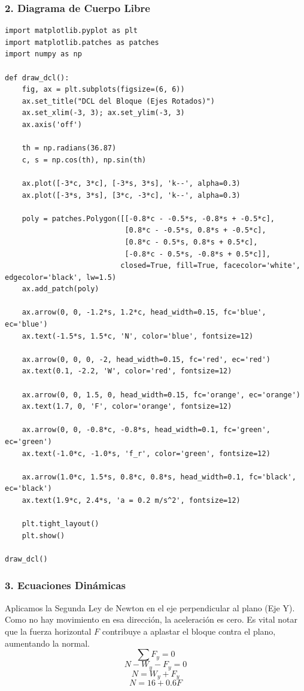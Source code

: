 \documentclass[12pt, a4paper]{article}
\begin{document}
\subsubsection*{2. Diagrama de Cuerpo Libre}

\begin{lstlisting}
import matplotlib.pyplot as plt
import matplotlib.patches as patches
import numpy as np

def draw_dcl():
    fig, ax = plt.subplots(figsize=(6, 6))
    ax.set_title("DCL del Bloque (Ejes Rotados)")
    ax.set_xlim(-3, 3); ax.set_ylim(-3, 3)
    ax.axis('off')
    
    th = np.radians(36.87)
    c, s = np.cos(th), np.sin(th)
    
    ax.plot([-3*c, 3*c], [-3*s, 3*s], 'k--', alpha=0.3)
    ax.plot([-3*s, 3*s], [3*c, -3*c], 'k--', alpha=0.3)
    
    poly = patches.Polygon([[-0.8*c - -0.5*s, -0.8*s + -0.5*c], 
                            [0.8*c - -0.5*s, 0.8*s + -0.5*c], 
                            [0.8*c - 0.5*s, 0.8*s + 0.5*c], 
                            [-0.8*c - 0.5*s, -0.8*s + 0.5*c]], 
                           closed=True, fill=True, facecolor='white', edgecolor='black', lw=1.5)
    ax.add_patch(poly)
    
    ax.arrow(0, 0, -1.2*s, 1.2*c, head_width=0.15, fc='blue', ec='blue')
    ax.text(-1.5*s, 1.5*c, 'N', color='blue', fontsize=12)
    
    ax.arrow(0, 0, 0, -2, head_width=0.15, fc='red', ec='red')
    ax.text(0.1, -2.2, 'W', color='red', fontsize=12)
    
    ax.arrow(0, 0, 1.5, 0, head_width=0.15, fc='orange', ec='orange')
    ax.text(1.7, 0, 'F', color='orange', fontsize=12)
    
    ax.arrow(0, 0, -0.8*c, -0.8*s, head_width=0.1, fc='green', ec='green')
    ax.text(-1.0*c, -1.0*s, 'f_r', color='green', fontsize=12)
    
    ax.arrow(1.0*c, 1.5*s, 0.8*c, 0.8*s, head_width=0.1, fc='black', ec='black')
    ax.text(1.9*c, 2.4*s, 'a = 0.2 m/s^2', fontsize=12)

    plt.tight_layout()
    plt.show()

draw_dcl()
\end{lstlisting}

\subsubsection*{3. Ecuaciones Dinámicas}
Aplicamos la Segunda Ley de Newton en el eje perpendicular al plano (Eje Y). Como no hay movimiento en esa dirección, la aceleración es cero. Es vital notar que la fuerza horizontal $F$ contribuye a aplastar el bloque contra el plano, aumentando la normal.
$$ \sum F_y = 0 $$
$$ N - W_y - F_y = 0 $$
$$ N = W_y + F_y $$
$$ N = 16 + 0.6 F $$
\end{document}
